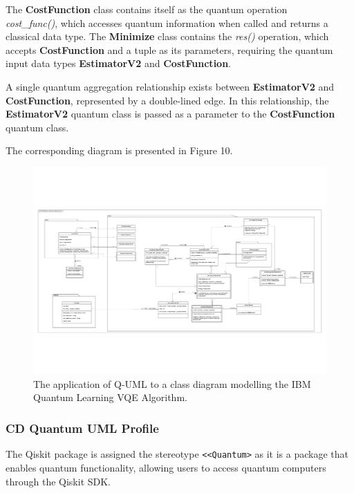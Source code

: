 \documentclass{article}
\begin{document}
The \textbf{CostFunction} class contains itself as the quantum operation\\ \textit{cost\_func()}, which accesses quantum information when called and returns a classical data type. The \textbf{Minimize} class contains the \textit{res()} operation, which accepts \textbf{CostFunction} and a tuple as its parameters, requiring the quantum input data types \textbf{EstimatorV2} and \textbf{CostFunction}.

A single quantum aggregation relationship exists between \textbf{EstimatorV2} and \textbf{CostFunction}, represented by a double-lined edge. In this relationship, the \textbf{EstimatorV2} quantum class is passed as a parameter to the \textbf{CostFunction} quantum class.

The corresponding diagram is presented in Figure 10.

\begin{figure}
    \centering
    \includegraphics[width=1\linewidth]{VQE QUML CD Final Version.pdf}
    \caption{The application of Q-UML to a class diagram modelling the IBM Quantum Learning VQE Algorithm.}
    \label{fig:Q-UML_CD}
\end{figure}

\subsubsection{CD Quantum UML Profile}

The Qiskit package is assigned the stereotype \texttt{<<Quantum>} as it is a package that enables quantum functionality, allowing users to access quantum computers through the Qiskit SDK. 
\end{document}
